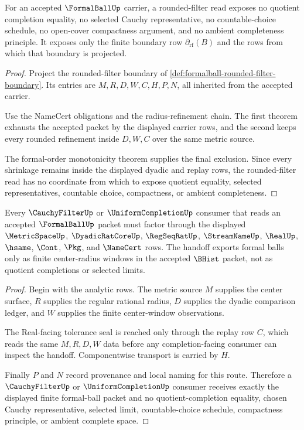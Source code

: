 \begin{theorem}
\label{thm:formalball-rounded-filter-nonescape}
For an accepted $\FormalBallUp$ carrier, a rounded-filter read exposes no quotient completion equality, no selected Cauchy representative, no countable-choice schedule, no open-cover compactness argument, and no ambient completeness principle. It exposes only the finite boundary row $\partial_{\mathrm{rf}}(B)$ and the rows from which that boundary is projected.
\end{theorem}
\begin{proof}
Project the rounded-filter boundary of \autoref{def:formalball-rounded-filter-boundary}. Its entries are $M,R,D,W,C,H,P,N$, all inherited from the accepted carrier.

Use the NameCert obligations and the radius-refinement chain. The first theorem exhausts the accepted packet by the displayed carrier rows, and the second keeps every rounded refinement inside $D,W,C$ over the same metric source.

The formal-order monotonicity theorem supplies the final exclusion. Since every shrinkage remains inside the displayed dyadic and replay rows, the rounded-filter read has no coordinate from which to expose quotient equality, selected representatives, countable choice, compactness, or ambient completeness.
\end{proof}

\begin{theorem}
\label{thm:formalball-cauchy-filter-handoff}
Every $\CauchyFilterUp$ or $\UniformCompletionUp$ consumer that reads an accepted $\FormalBallUp$ packet must factor through the displayed $\MetricSpaceUp$, $\DyadicRatCoreUp$, $\RegSeqRatUp$, $\StreamNameUp$, $\RealUp$, $\hsame$, $\Cont$, $\Pkg$, and $\NameCert$ rows. The handoff exports formal balls only as finite center-radius windows in the accepted $\BHist$ packet, not as quotient completions or selected limits.
\end{theorem}
\begin{proof}
Begin with the analytic rows. The metric source $M$ supplies the center surface, $R$ supplies the regular rational radius, $D$ supplies the dyadic comparison ledger, and $W$ supplies the finite center-window observations.

The Real-facing tolerance seal is reached only through the replay row $C$, which reads the same $M,R,D,W$ data before any completion-facing consumer can inspect the handoff. Componentwise transport is carried by $H$.

Finally $P$ and $N$ record provenance and local naming for this route. Therefore a $\CauchyFilterUp$ or $\UniformCompletionUp$ consumer receives exactly the displayed finite formal-ball packet and no quotient-completion equality, chosen Cauchy representative, selected limit, countable-choice schedule, compactness principle, or ambient complete space.
\end{proof}

